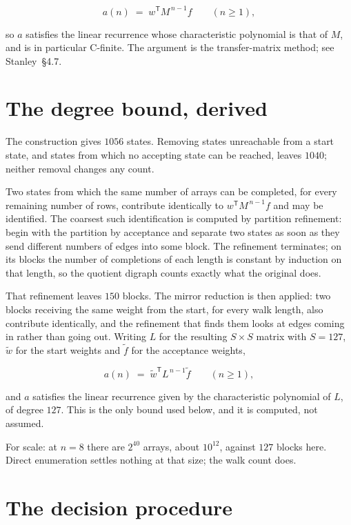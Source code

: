 \documentclass[11pt]{article}
\theoremstyle{definition}
\begin{document}
\[a(n) \;=\; w^{\mathsf T} M^{\,n-1} f \qquad (n \ge 1),\]

so $a$ satisfies the linear recurrence whose characteristic polynomial is that of $M$, and is in particular C-finite. The argument is the transfer-matrix method; see Stanley~\S4.7.

\section{The degree bound, derived}

The construction gives $1056$ states. Removing states unreachable from a start state, and states from which no accepting state can be reached, leaves $1040$; neither removal changes any count.

Two states from which the same number of arrays can be completed, for every remaining number of rows, contribute identically to $w^{\mathsf T}M^{\,n-1}f$ and may be identified. The coarsest such identification is computed by partition refinement: begin with the partition by acceptance and separate two states as soon as they send different numbers of edges into some block. The refinement terminates; on its blocks the number of completions of each length is constant by induction on that length, so the quotient digraph counts exactly what the original does.

That refinement leaves $150$ blocks. The mirror reduction is then applied: two blocks receiving the same weight from the start, for every walk length, also contribute identically, and the refinement that finds them looks at edges coming in rather than going out. Writing $L$ for the resulting $S \times S$ matrix with $S = 127$, $\tilde w$ for the start weights and $\tilde f$ for the acceptance weights,

\[a(n) \;=\; \tilde w^{\mathsf T} L^{\,n-1} \tilde f \qquad (n \ge 1),\]

and $a$ satisfies the linear recurrence given by the characteristic polynomial of $L$, of degree $127$. This is the only bound used below, and it is computed, not assumed.

For scale: at $n = 8$ there are $2^{40}$ arrays, about $10^{12}$, against $127$ blocks here. Direct enumeration settles nothing at that size; the walk count does.

\section{The decision procedure}
\end{document}

